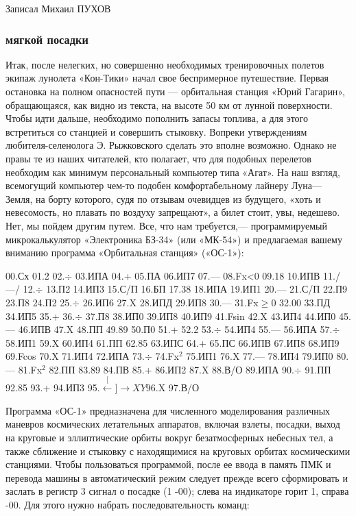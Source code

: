 \documentclass[11pt,a4paper,oneside]{article}
\def\XY{$\stackrel[\leftarrow]{\rightarrow}{XY}$}
\begin{document}
Записал Михаил ПУХОВ

\subsubsection{мягкой посадки}
Итак, после нелегких, но совершенно необходимых тренировочных полетов экипаж лунолета «Кон-Тики» начал свое беспримерное путешествие. Первая остановка на полном опасностей пути — орбитальная станция «Юрий Гагарин», обращающаяся, как видно из текста, на высоте 50 км от лунной поверхности. Чтобы идти дальше, необходимо пополнить запасы топлива, а для этого встретиться со станцией и совершить стыковку. Вопреки утверждениям любителя-селенолога Э. Рыжковского сделать это вполне возможно. Однако не правы те из наших читателей, кто полагает, что для подобных перелетов необходим как минимум персональный компьютер типа «Агат». На наш взгляд, всемогущий компьютер чем-то подобен комфортабельному лайнеру Луна— Земля, на борту которого, судя по отзывам очевидцев из будущего, «хоть и невесомость, но плавать по воздуху запрещают», а билет стоит, увы, недешево. Нет, мы пойдем другим путем. Все, что нам требуется,— программируемый микрокалькулятор «Электроника БЗ-34» (или «МК-54») и предлагаемая вашему вниманию программа «Орбитальная станция» («ОС-1»):

00.Сх 01.2 02.$\div$ 03.ИПА 04.+ 05.ПА 06.ИП7 07.— 08.Fx<0 09.18 10.ИПВ 11./—/ 12.$\div$ 13.П2 14.ИП3 15.С/П
16.БП 17.38 18.ИПА 19.ИП1 20.—
21.С/П 22.П9 23.П8 24.П2 25.$\div$ 26.ИП6
27.X 28.ИПД 29.ИП8 30.— 31.Fx$\geq$0 32.00 33.ПД 34.ИП5 35.+ 36.$\div$ 37.П8
38.ИП0 39.ИП8 40.ИП9 41.Fsin
42.X 43.ИП4 44.ИП0 45.— 46.ИПВ 47.X
48.ПП 49.89 50.П0 51.+ 52.2 53.$\div$ 54.ИП4 55.— 56.ИПА 57.$\div$ 58.ИП1 59.X
60.ИП4 61.ПП 62.85 63.ИПС 64.+
65.ПС 66.ИПВ 67.ИП8 68.ИП9 69.Fcos
70.X 71.ИП4 72.ИПА 73.$\div$ 74.Fx$^{2}$
75.ИП1 76.X 77.— 78.ИП4 79.ИП0 80.— 81.Fx$^{2}$ 82.ПП 83.89 84.ПВ 85.+ 86.ИП2 87.X 88.В/О 89.ИПА 90.$\div$ 91.ПП 92.85
93.+ 94.ИП3 95.\XY 96.X 97.В/О

Программа «ОС-1» предназначена для численного моделирования различных маневров космических летательных аппаратов, включая взлеты, посадки, выход на круговые и эллиптические орбиты вокруг безатмосферных небесных тел, а также сближение и стыковку с находящимися на круговых орбитах космическими станциями. Чтобы пользоваться программой, после ее ввода в память ПМК и перевода машины в автоматический режим следует прежде всего сформировать и заслать в регистр 3 сигнал о посадке (1 -00); слева на индикаторе горит 1, справа -00. Для этого нужно набрать последовательность команд:
\end{document}
